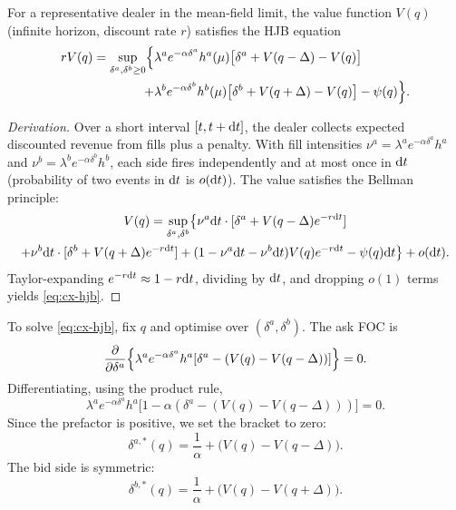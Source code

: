 For a representative dealer in the mean-field limit, the value function $V(q)$ (infinite horizon, discount rate $r$) satisfies the HJB equation
\begin{align}
  r V(q) = \sup_{\delta^a, \delta^b \geq 0} \Bigl\{ & \lambda^a e^{-\alpha \delta^a} h^a(\mu) \bigl[\delta^a + V(q - \Delta) - V(q)\bigr] \nonumber \\
  + & \lambda^b e^{-\alpha \delta^b} h^b(\mu) \bigl[\delta^b + V(q + \Delta) - V(q)\bigr] - \psi(q) \Bigr\}.
  \label{eq:cx-hjb}
\end{align}

\begin{proof}[Derivation]
Over a short interval $[t, t + \mathrm{d} t]$, the dealer collects expected discounted revenue from fills plus a penalty. With fill intensities $\nu^a = \lambda^a e^{-\alpha \delta^a} h^a$ and $\nu^b = \lambda^b e^{-\alpha \delta^b} h^b$, each side fires independently and at most once in $\mathrm{d} t$ (probability of two events in $\mathrm{d} t$ is $o(\mathrm{d} t)$). The value satisfies the Bellman principle:
\begin{multline}
  V(q) = \sup_{\delta^a, \delta^b} \bigl\{ \nu^a \mathrm{d} t \cdot [\delta^a + V(q - \Delta) e^{-r \mathrm{d} t}] \\
  + \nu^b \mathrm{d} t \cdot [\delta^b + V(q + \Delta) e^{-r \mathrm{d} t}] + (1 - \nu^a \mathrm{d} t - \nu^b \mathrm{d} t) V(q) e^{-r \mathrm{d} t} - \psi(q) \mathrm{d} t \bigr\} + o(\mathrm{d} t).
\end{multline}
Taylor-expanding $e^{-r \mathrm{d} t} \approx 1 - r \mathrm{d} t$, dividing by $\mathrm{d} t$, and dropping $o(1)$ terms yields \eqref{eq:cx-hjb}.
\end{proof}

To solve \eqref{eq:cx-hjb}, fix $q$ and optimise over $(\delta^a, \delta^b)$. The ask FOC is
\begin{equation}
  \frac{\partial}{\partial \delta^a}\Bigl\{ \lambda^a e^{-\alpha \delta^a} h^a [\delta^a - (V(q) - V(q - \Delta))] \Bigr\} = 0.
\end{equation}
Differentiating, using the product rule,
\begin{equation}
  \lambda^a e^{-\alpha \delta^a} h^a \bigl[1 - \alpha(\delta^a - (V(q) - V(q - \Delta)))\bigr] = 0.
\end{equation}
Since the prefactor is positive, we set the bracket to zero:
\begin{equation}
  \boxed{\delta^{a, *}(q) = \frac{1}{\alpha} + \bigl(V(q) - V(q - \Delta)\bigr).}
  \label{eq:foc-ask}
\end{equation}
The bid side is symmetric:
\begin{equation}
  \boxed{\delta^{b, *}(q) = \frac{1}{\alpha} + \bigl(V(q) - V(q + \Delta)\bigr).}
  \label{eq:foc-bid}
\end{equation}

